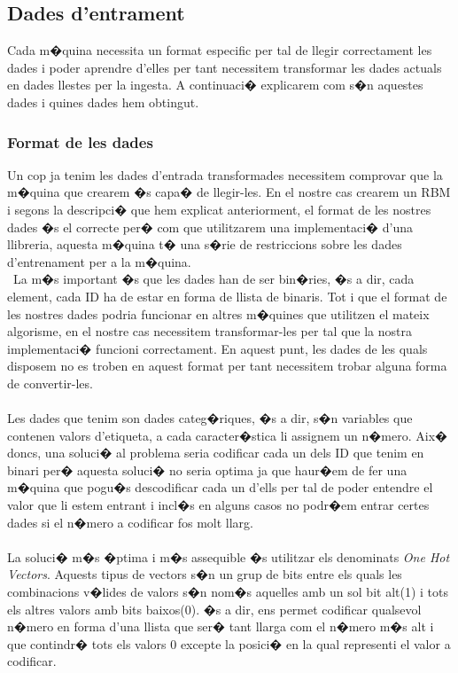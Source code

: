 \documentclass[12pt,a4paper,openright,oneside]{article}
\numberwithin{equation}{section}
\theoremstyle{definition}
\begin{document}
\subsection{Dades d'entrament}
Cada m�quina necessita un format especific per tal de llegir correctament les dades i poder aprendre d'elles per tant necessitem transformar les dades actuals en dades llestes per la ingesta. A continuaci� explicarem com s�n aquestes dades i quines dades hem obtingut.
\subsubsection{Format de les dades}
Un cop ja tenim les dades d'entrada transformades necessitem comprovar que la m�quina que crearem �s capa� de llegir-les. En el nostre cas crearem un RBM i segons la descripci� que hem explicat anteriorment, el format de les nostres dades �s el correcte per� com que utilitzarem una implementaci� d'una llibreria, aquesta m�quina t� una s�rie de restriccions sobre les dades d'entrenament per a la m�quina. \\\
La m�s important �s que les dades han de ser bin�ries, �s a dir, cada element, cada ID ha de estar en forma de llista de binaris. Tot i que el format de les nostres dades podria funcionar en altres m�quines que utilitzen el mateix algorisme, en el nostre cas necessitem transformar-les per tal que la nostra implementaci� funcioni correctament. En aquest punt, les dades de les quals disposem no es troben en aquest format per tant necessitem trobar alguna forma de convertir-les.\\\\
Les dades que tenim son dades categ�riques, �s a dir, s�n variables que contenen valors d'etiqueta, a cada caracter�stica li assignem un n�mero. Aix� doncs, una soluci� al problema seria codificar cada un dels ID que tenim en binari per� aquesta soluci� no seria optima ja que haur�em de fer una m�quina que pogu�s descodificar cada un d'ells per tal de poder entendre el valor que li estem entrant i incl�s en alguns casos no podr�em entrar certes dades si el n�mero a codificar fos molt llarg.\\\\
La soluci� m�s �ptima i m�s assequible �s utilitzar els denominats \textit{One Hot Vectors}. Aquests tipus de vectors s�n un grup de bits entre els quals les combinacions v�lides de valors s�n nom�s aquelles amb un sol bit alt(1) i tots els altres valors amb bits baixos(0). �s a dir, ens permet codificar qualsevol n�mero en forma d'una llista que ser� tant llarga com el n�mero m�s alt i que contindr� tots els valors 0 excepte la posici� en la qual representi el valor a codificar.\\\\
\end{document}
